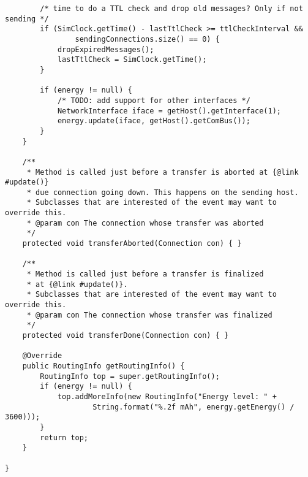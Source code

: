 \documentclass[11pt]{icsthesis}
\begin{document}
\begin{framed}
\begin{verbatim}
		/* time to do a TTL check and drop old messages? Only if not sending */
		if (SimClock.getTime() - lastTtlCheck >= ttlCheckInterval && 
				sendingConnections.size() == 0) {
			dropExpiredMessages();
			lastTtlCheck = SimClock.getTime();
		}
		
		if (energy != null) {
			/* TODO: add support for other interfaces */
			NetworkInterface iface = getHost().getInterface(1);
			energy.update(iface, getHost().getComBus());
		}
	}
	
	/**
	 * Method is called just before a transfer is aborted at {@link #update()} 
	 * due connection going down. This happens on the sending host. 
	 * Subclasses that are interested of the event may want to override this. 
	 * @param con The connection whose transfer was aborted
	 */
	protected void transferAborted(Connection con) { }
	
	/**
	 * Method is called just before a transfer is finalized 
	 * at {@link #update()}.
	 * Subclasses that are interested of the event may want to override this.
	 * @param con The connection whose transfer was finalized
	 */
	protected void transferDone(Connection con) { }
	
	@Override
	public RoutingInfo getRoutingInfo() {
		RoutingInfo top = super.getRoutingInfo();
		if (energy != null) {
			top.addMoreInfo(new RoutingInfo("Energy level: " + 
					String.format("%.2f mAh", energy.getEnergy() / 3600)));
		}
		return top;
	}
	
}
\end{verbatim}
\end{framed}
\end{document}
